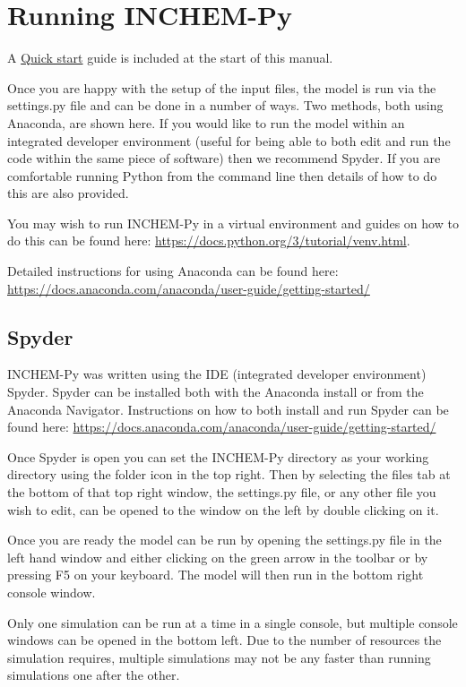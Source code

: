 \documentclass[a4paper]{refart}
\begin{document}
\newpage
\section{Running INCHEM-Py}
A \hyperref[Quick start]{Quick start} guide is included at the start of this manual.

Once you are happy with the setup of the input files, the model is run via the settings.py file and can be done in a number of ways. Two methods, both using Anaconda, are shown here. If you would like to run the model within an integrated developer environment (useful for being able to both edit and run the code within the same piece of software) then we recommend Spyder. If you are comfortable running Python from the command line then details of how to do this are also provided.

You may wish to run INCHEM-Py in a virtual environment and guides on how to do this can be found here: \url{https://docs.python.org/3/tutorial/venv.html}.

Detailed instructions for using Anaconda can be found here: \url{https://docs.anaconda.com/anaconda/user-guide/getting-started/}

\subsection{Spyder}
INCHEM-Py was written using the IDE (integrated developer environment) Spyder. Spyder can be installed both with the Anaconda install or from the Anaconda Navigator. Instructions on how to both install and run Spyder can be found here: \url{https://docs.anaconda.com/anaconda/user-guide/getting-started/}

Once Spyder is open you can set the INCHEM-Py directory as your working directory using the folder icon in the top right. Then by selecting the files tab at the bottom of that top right window, the settings.py file, or any other file you wish to edit, can be opened to the window on the left by double clicking on it.

Once you are ready the model can be run by opening the settings.py file in the left hand window and either clicking on the green arrow in the toolbar or by pressing F5 on your keyboard. The model will then run in the bottom right console window.

Only one simulation can be run at a time in a single console, but multiple console windows can be opened in the bottom left. Due to the number of resources the simulation requires, multiple simulations may not be any faster than running simulations one after the other.
\end{document}
